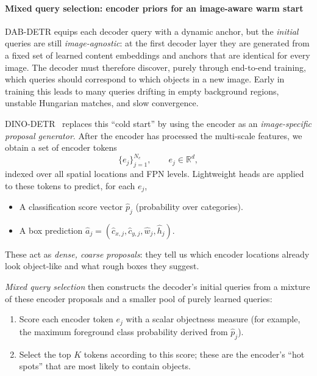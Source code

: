 \begin{enrichment}
\begin{enrichment}
		\paragraph{Mixed query selection: encoder priors for an image-aware warm start}
		DAB-DETR equips each decoder query with a dynamic anchor, but the \emph{initial} queries are still \emph{image-agnostic}: at the first decoder layer they are generated from a fixed set of learned content embeddings and anchors that are identical for every image. The decoder must therefore discover, purely through end-to-end training, which queries should correspond to which objects in a new image. Early in training this leads to many queries drifting in empty background regions, unstable Hungarian matches, and slow convergence.
		
		DINO-DETR~\cite{zhang2022_dino} replaces this ``cold start'' by using the encoder as an \emph{image-specific proposal generator}. After the encoder has processed the multi-scale features, we obtain a set of encoder tokens
		\[
		\{e_j\}_{j=1}^{N_e}, \qquad e_j \in \mathbb{R}^d,
		\]
		indexed over all spatial locations and FPN levels. Lightweight heads are applied to these tokens to predict, for each $e_j$,
		\begin{itemize}
			\item A classification score vector $\hat{p}_j$ (probability over categories).
			\item A box prediction $\hat{a}_j = (\hat{c}_{x,j}, \hat{c}_{y,j}, \hat{w}_j, \hat{h}_j)$.
		\end{itemize}
		These act as \emph{dense, coarse proposals}: they tell us which encoder locations already look object-like and what rough boxes they suggest.
		
		\emph{Mixed query selection} then constructs the decoder's initial queries from a mixture of these encoder proposals and a smaller pool of purely learned queries:
		\begin{enumerate}
			\item Score each encoder token $e_j$ with a scalar objectness measure (for example, the maximum foreground class probability derived from $\hat{p}_j$).
			\item Select the top $K$ tokens according to this score; these are the encoder's ``hot spots'' that are most likely to contain objects.
			
			\newpage
			

\end{enumerate}
\end{enrichment}
\end{enrichment}
